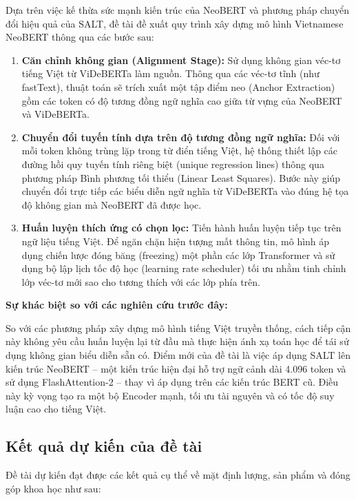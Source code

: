 \documentclass{article}[14pt]
\begin{document}
{    Dựa trên việc kế thừa sức mạnh kiến trúc của NeoBERT và phương pháp chuyển đổi hiệu quả của SALT, đề tài đề xuất quy trình xây dựng mô hình Vietnamese NeoBERT thông qua các bước sau:
    
    \begin{enumerate}
        \item \textbf{Căn chỉnh không gian (Alignment Stage):} Sử dụng không gian véc-tơ tiếng Việt từ ViDeBERTa làm nguồn. Thông qua các véc-tơ tĩnh (như fastText), thuật toán sẽ trích xuất một tập điểm neo (Anchor Extraction) gồm các token có độ tương đồng ngữ nghĩa cao giữa từ vựng của NeoBERT và ViDeBERTa.
        \item \textbf{Chuyển đổi tuyến tính dựa trên độ tương đồng ngữ nghĩa:} Đối với mỗi token không trùng lặp trong từ điển tiếng Việt, hệ thống thiết lập các đường hồi quy tuyến tính riêng biệt (unique regression lines) thông qua phương pháp Bình phương tối thiểu (Linear Least Squares). Bước này giúp chuyển đổi trực tiếp các biểu diễn ngữ nghĩa từ ViDeBERTa vào đúng hệ tọa độ không gian mà NeoBERT đã được học.
        \item \textbf{Huấn luyện thích ứng có chọn lọc:} Tiến hành huấn luyện tiếp tục trên ngữ liệu tiếng Việt. Để ngăn chặn hiện tượng mất thông tin, mô hình áp dụng chiến lược đóng băng (freezing) một phần các lớp Transformer và sử dụng bộ lập lịch tốc độ học (learning rate scheduler) tối ưu nhằm tinh chỉnh lớp véc-tơ mới sao cho tương thích với các lớp phía trên.
    \end{enumerate}
    
    \textbf{Sự khác biệt so với các nghiên cứu trước đây:}
    
    So với các phương pháp xây dựng mô hình tiếng Việt truyền thống, cách tiếp cận này không yêu cầu huấn luyện lại từ đầu mà thực hiện ánh xạ toán học để tái sử dụng không gian biểu diễn sẵn có. Điểm mới của đề tài là việc áp dụng SALT lên kiến trúc NeoBERT -- một kiến trúc hiện đại hỗ trợ ngữ cảnh dài 4.096 token và sử dụng FlashAttention-2 -- thay vì áp dụng trên các kiến trúc BERT cũ. Điều này kỳ vọng tạo ra một bộ Encoder mạnh, tối ưu tài nguyên và có tốc độ suy luận cao cho tiếng Việt.
     
    \subsection{Kết quả dự kiến của đề tài}
        
    Đề tài dự kiến đạt được các kết quả cụ thể về mặt định lượng, sản phẩm và đóng góp khoa học như sau:
    
}
\end{document}
